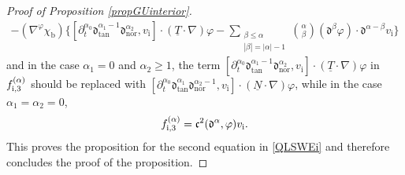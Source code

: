 \documentclass[10pt]{amsart}
\newcommand{\dtan}{{\mathfrak d}_\mathrm{tan}}
\newcommand{\dnor}{{\mathfrak d}_\mathrm{nor}}
\newcommand{\dt}{\partial_t}
\newcommand{\ul}[1]{\underline{#1}}
\theoremstyle{definition}
\begin{document}
\begin{proof}[Proof of Proposition \ref{propGUinterior}]
\begin{multline}
- (\nabla^\varphi\chi_\mathrm{b})\biggl\{ [\dt^{\alpha_0}\dtan^{\alpha_1-1}\dnor^{\alpha_2},v_\mathrm{i}]\cdot(\ul{T}\cdot\nabla)\varphi
- \sum_{\substack{\beta\leq\alpha\\ |\beta|=|\alpha|-1}} \binom{\alpha}{\beta}(\mathfrak{d}^{\beta}\varphi)\cdot\mathfrak{d}^{\alpha-\beta}v_\mathrm{i} \biggr\}
\end{multline}
and in the case $\alpha_1=0$ and $\alpha_2\geq1$, the term $[\dt^{\alpha_0}\dtan^{\alpha_1-1}\dnor^{\alpha_2},v_\mathrm{i}]\cdot(\ul{T}\cdot\nabla)\varphi$
in $f_{{\rm i},3}^{(\alpha)}$ should be replaced with $[\dt^{\alpha_0}\dtan^{\alpha_1}\dnor^{\alpha_2-1},v_\mathrm{i}]\cdot(\ul{N}\cdot\nabla)\varphi$,
while in the case $\alpha_1=\alpha_2=0$,
\begin{equation}\label{deffi3bis}
f_{{\rm i},3}^{(\alpha)} = \mathfrak{c}^2(\mathfrak{d}^\alpha,\varphi)v_\mathrm{i}.
\end{equation}
This proves the proposition for the second equation in \eqref{QLSWEi} and therefore concludes the proof of the proposition.
\end{proof}
\end{document}
